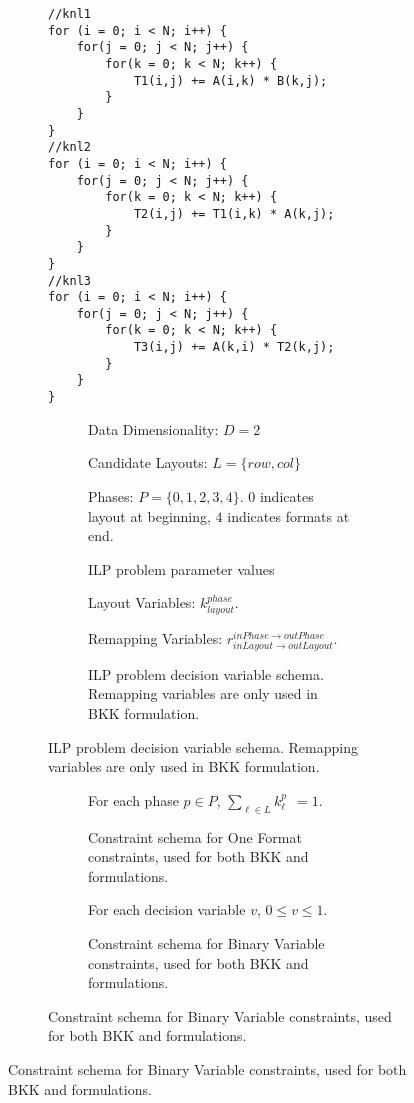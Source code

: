 \begin{figure}
\begin{subfigure}{0.4\columnwidth}
\begin{lstlisting}[caption={Example loop chain. The selection problem targets the \texttt{A} array. Code is shown using standard C++ for loops rather than RAJA kernels for the reader's familiarity.},label=SelectionExampleCode]
//knl1
for (i = 0; i < N; i++) {
	for(j = 0; j < N; j++) {
		for(k = 0; k < N; k++) {
			T1(i,j) += A(i,k) * B(k,j);
		}
	}
}
//knl2
for (i = 0; i < N; i++) {
	for(j = 0; j < N; j++) {
		for(k = 0; k < N; k++) {
			T2(i,j) += T1(i,k) * A(k,j);
		}
	}
}
//knl3
for (i = 0; i < N; i++) {
	for(j = 0; j < N; j++) {
		for(k = 0; k < N; k++) {
			T3(i,j) += A(k,i) * T2(k,j);
		}
	}
}

\end{lstlisting}
\end{subfigure}
\hspace{0.05\columnwidth}
\begin{subfigure}{0.5\columnwidth}
\begin{subfigure}{\columnwidth}
Data Dimensionality: $D = 2$

Candidate Layouts: $L = \{row, col\}$

Phases: $P = \{0,1,2,3,4\}$. $0$ indicates layout at beginning, $4$ indicates formats at end.
\caption{ILP problem parameter values}
\end{subfigure}

\vspace{20pt}


\begin{subfigure}{\columnwidth}
Layout Variables: $k_{layout}^{phase}$. 

Remapping Variables: $r_{inLayout \rightarrow outLayout}^{inPhase \rightarrow outPhase}$.

\caption{ILP problem decision variable schema. Remapping variables are only used in BKK formulation.}
\end{subfigure}
\end{subfigure} %

\begin{subfigure}{\columnwidth} 
\begin{subfigure}{0.45\columnwidth}
For each phase $p \in P$, $\sum_{\ell \in L} k_{\ell}^{p} \ \ = 1$.
\caption{Constraint schema for One Format constraints, used for both BKK and \FormatDecisions{} formulations.}
\end{subfigure}
\hspace{.1\columnwidth}
\begin{subfigure}{0.45\columnwidth}
For each decision variable $v$, $0 \leq v \leq 1$.
\caption{Constraint schema for Binary Variable constraints, used for both BKK and \FormatDecisions{} formulations.}
\end{subfigure}
\end{subfigure}


\end{figure}
